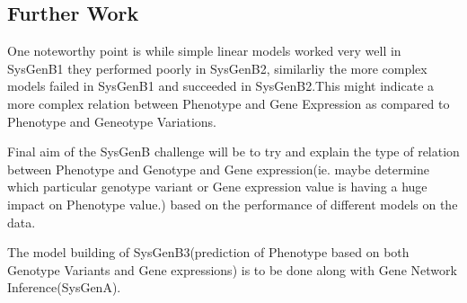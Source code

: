 \documentclass{ifacconf}
\begin{document}
\subsection{Further Work}

One noteworthy point is while simple linear models worked very well in SysGenB1 they performed poorly in SysGenB2, similarliy the more complex models failed in SysGenB1 and succeeded in SysGenB2.This might indicate a more complex relation between Phenotype and Gene Expression as compared to Phenotype and Geneotype Variations.

Final aim of the SysGenB challenge will be to try and explain the type of relation between Phenotype and Genotype and Gene expression(ie. maybe determine which particular genotype variant or Gene expression value is having a huge impact on Phenotype value.) based on the performance of different models on the data.

The model building of SysGenB3(prediction of Phenotype based on both Genotype Variants and Gene expressions) is to be done along with Gene Network Inference(SysGenA).


 
\end{document}
